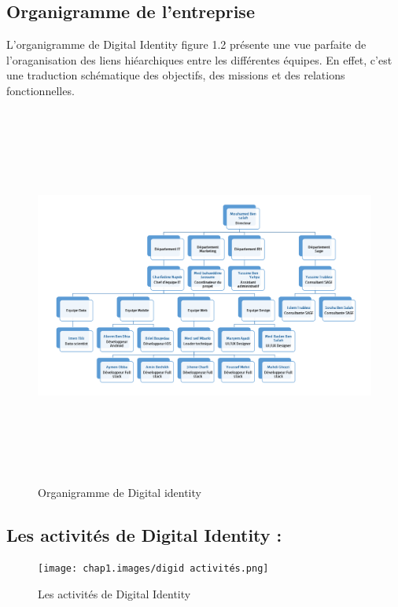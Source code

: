 

\newpage
\subsection{ Organigramme de l’entreprise }

L’organigramme de Digital Identity figure 1.2 présente une vue parfaite de l’oraganisation des
liens hiéarchiques entre les différentes équipes. En effet, c’est une traduction schématique des
objectifs, des missions et des relations fonctionnelles.

\begin{figure}[ht]
    \centering
    \includegraphics[width=1.1\textwidth,height=12.5cm]{chap1.images/org digid.png}
    \caption{Organigramme de Digital identity}
    \label{fig:orgcogecom}
\end{figure}


\subsection{ Les activités de Digital Identity : }
\begin{figure}[ht]
    \centering
    \texttt{[image: chap1.images/digid activités.png]}
    \caption{Les activités de Digital Identity}
\end{figure}
\newpage
